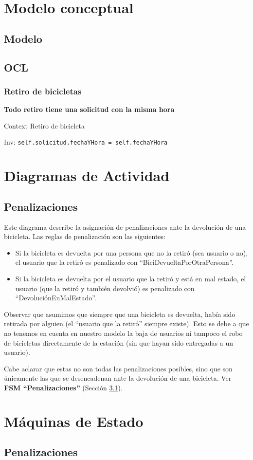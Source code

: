 \documentclass[a4paper, 10pt, twoside]{article}
\newcommand{\ocl}[3] {
  \textbf{#1}

  Context #2

  Inv:
  \lstinline[language=OCL]{#3}
}
\begin{document}
\section{Modelo conceptual}

\subsection{Modelo}

\subsection{OCL}
\subsubsection{Retiro de bicicletas}
\ocl{Todo retiro tiene una solicitud con la misma hora}{Retiro de bicicleta}{self.solicitud.fechaYHora = self.fechaYHora}

\section{Diagramas de Actividad}

\subsection{Penalizaciones}

Este diagrama describe la asignación de penalizaciones ante la devolución de una bicicleta. Las reglas de penalización son las siguientes:
\begin{itemize}
 \item Si la bicicleta es devuelta por una persona que no la retiró (sea usuario o no), el usuario que la retiró es penalizado con
 ``BiciDevueltaPorOtraPersona''.
 \item Si la bicicleta es devuelta por el usuario que la retiró y está en mal estado, el usuario (que la retiró y también devolvió) es penalizado
 con ``DevoluciónEnMalEstado''.
\end{itemize}
Observar que asumimos que siempre que una bicicleta es devuelta, había sido retirada por alguien (el ``usuario que la retiró'' siempre existe).
Esto se debe a que no tenemos en cuenta en nuestro modelo la baja de usuarios ni tampoco el robo de bicicletas directamente de la estación (sin que hayan sido entregadas a un usuario).

Cabe aclarar que estas no son todas las penalizaciones posibles, sino que son únicamente las que se desencadenan ante la devolución de una bicicleta.
Ver {\bf FSM ``Penalizaciones''} (Sección \ref{fsm:penalizaciones}).


\section{Máquinas de Estado}
\subsection{Penalizaciones} \label{fsm:penalizaciones}
\end{document}

